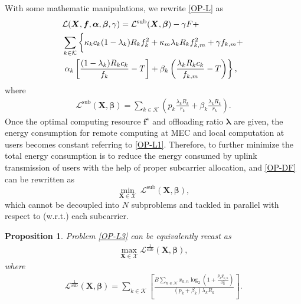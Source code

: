 \documentclass[journal]{IEEEtran}
\newtheorem{proposition}{Proposition}
\begin{document}
With some mathematic manipulations, we rewrite \eqref{OP-L} as
\begin{equation}\label{OP-L1}
\begin{aligned}
& \mathcal{L}(\boldsymbol{X},\boldsymbol{f},\boldsymbol\alpha,\boldsymbol\beta,\gamma) =\mathcal{L}^\text{sub}(\boldsymbol{X},\boldsymbol\beta)-\gamma F+\\
&\sum_{k\in\mathcal{K}}\left\{\vphantom{\frac{\lambda_{k}R_{k}c_{k}}{f_{k,m}}}\kappa_kc_{k}(1-\lambda_{k})R_kf_{k}^{2}+\kappa_{m}\lambda_{k}R_{k}f_{k,m}^{2}+\gamma f_{k,m}+\right.\\
&\left.\alpha_{k}\left[\frac{(1-\lambda_{k})R_{k}c_{k}}{f_{k}}-T\right]+\beta_{k}\left(\frac{\lambda_{k}R_{k}c_{k}}{f_{k,m}}-T\right)\right\},
\end{aligned}    
\end{equation}
where 
\begin{equation}\label{OP-L2}
\begin{aligned}
\mathcal{L}^\text{sub}(\boldsymbol{X},\boldsymbol\beta) =
\sum_{k\in\mathcal{K}}\left(p_{k}\frac{\lambda_{k}R_{k}}{r_{k}}+\beta_{k}\frac{\lambda_{k}R_{k}}{r_{k}}\right).
\end{aligned}    
\end{equation}
Once the optimal computing resource $\boldsymbol{f^\star}$ and offloading ratio $\boldsymbol{\lambda}$ are given, the energy consumption for remote computing at MEC and local computation at users becomes constant referring to \eqref{OP-L1}. Therefore, to further minimize the total energy consumption is to reduce the energy consumed by uplink transmission of users with the help of proper subcarrier allocation, and \eqref{OP-DF} can be rewritten as 
\begin{equation}\label{OP-L3}
    \min_{\boldsymbol{X}\in \mathcal{X}}~\mathcal{L}^\text{sub}(\boldsymbol{X},\boldsymbol\beta),
\end{equation}
which cannot be decoupled into $N$ subproblems and tackled in parallel with respect to (w.r.t.) each subcarrier. 
\begin{proposition}
Problem \eqref{OP-L3} can be equivalently recast as 
\begin{equation}\label{OP-L3a}
\begin{aligned}
\max_{\boldsymbol{X}\in \mathcal{X}}\mathcal{L}^{\frac{1}{\text{sub}}}(\boldsymbol{X},\boldsymbol\beta),
\end{aligned} 
\end{equation}
where 
\begin{equation}\label{OP-L3A}
\begin{aligned}
\mathcal{L}^{\frac{1}{\text{sub}}}(\boldsymbol{X},\boldsymbol\beta) \!\!=\!\!
\sum_{k\in\mathcal{K}}\left[\frac{B\sum_{n\in\mathcal{N}}x_{k,n}\log_2\left(1+\frac{p_{k}g_{k,n}}{\sigma_n^2}\right)}{(p_{k}+\beta_{k})\lambda_{k}R_{k}}\right].
\end{aligned} 
\end{equation}
\end{proposition}
\end{document}

